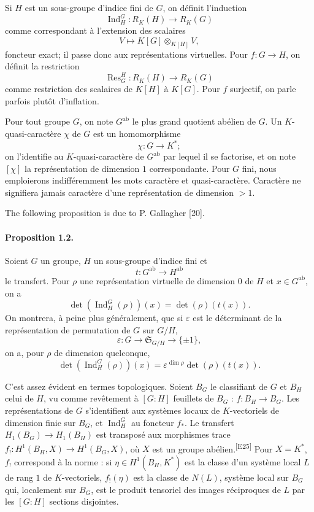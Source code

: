 \documentclass[10pt,letterpaper]{article}
\newcommand{\Ind}{\operatorname{Ind}}
\newcommand{\Res}{\operatorname{Res}}
\providecommand{\Ind}{\operatorname{Ind}}
\newcommand{\auditmark}[1]{\textsuperscript{\normalfont\scriptsize[E#1]}}
\begin{document}
Si \(H\) est un sous-groupe d'indice fini de \(G\), on définit l'induction
\[
\Ind_H^G:R_K(H)\longrightarrow R_K(G)
\]
comme correspondant à l'extension des scalaires
\[
V\longmapsto K[G]\otimes_{K[H]}V,
\]
foncteur exact; il passe donc aux représentations virtuelles. Pour \(f:G\to H\), on définit la restriction
\[
\Res_G^H:R_K(H)\longrightarrow R_K(G)
\]
comme restriction des scalaires de \(K[H]\) à \(K[G]\). Pour \(f\) surjectif, on parle parfois plutôt d'inflation.

Pour tout groupe \(G\), on note \(G^{\mathrm{ab}}\) le plus grand quotient abélien de \(G\). Un \(K\)-quasi-caractère \(\chi\) de \(G\) est un homomorphisme
\[
\chi:G\longrightarrow K^*;
\]
on l'identifie au \(K\)-quasi-caractère de \(G^{\mathrm{ab}}\) par lequel il se factorise, et on note \([\chi]\) la représentation de dimension \(1\) correspondante. Pour \(G\) fini, nous emploierons indifféremment les mots caractère et quasi-caractère. Caractère ne signifiera jamais caractère d'une représentation de dimension \(>1\).

The following proposition is due to P. Gallagher [20].

\paragraph{Proposition 1.2.} Soient \(G\) un groupe, \(H\) un sous-groupe d'indice fini et
\[
t:G^{\mathrm{ab}}\longrightarrow H^{\mathrm{ab}}
\]
le transfert. Pour \(\rho\) une représentation virtuelle de dimension \(0\) de \(H\) et \(x\in G^{\mathrm{ab}}\), on a
\[
\det(\Ind_H^G(\rho))(x)=\det(\rho)(t(x)).
\]
On montrera, à peine plus généralement, que si \(\varepsilon\) est le déterminant de la représentation de permutation de \(G\) sur \(G/H\),
\[
\varepsilon:G\longrightarrow \mathfrak S_{G/H}\longrightarrow \{\pm1\},
\]
on a, pour \(\rho\) de dimension quelconque,
\[
\det(\Ind_H^G(\rho))(x)=\varepsilon^{\dim\rho}\det(\rho)(t(x)).
\]

C'est assez évident en termes topologiques. Soient \(B_G\) le classifiant de \(G\) et \(B_H\) celui de \(H\), vu comme revêtement à \([G:H]\) feuillets de \(B_G\) : \(f:B_H\to B_G\). Les représentations de \(G\) s'identifient aux systèmes locaux de \(K\)-vectoriels de dimension finie sur \(B_G\), et \(\Ind_H^G\) au foncteur \(f_*\). Le transfert \(H_1(B_G)\to H_1(B_H)\) est transposé aux morphismes trace \(f_!:H^1(B_H,X)\to H^1(B_G,X)\), où \(X\) est un groupe abélien.\auditmark{25} Pour \(X=K^*\), \(f_!\) correspond à la norme : si \(\eta\in H^1(B_H,K^*)\) est la classe d'un système local \(L\) de rang \(1\) de \(K\)-vectoriels, \(f_!(\eta)\) est la classe de \(N(L)\), système local sur \(B_G\) qui, localement sur \(B_G\), est le produit tensoriel des images réciproques de \(L\) par les \([G:H]\) sections disjointes.
\end{document}
